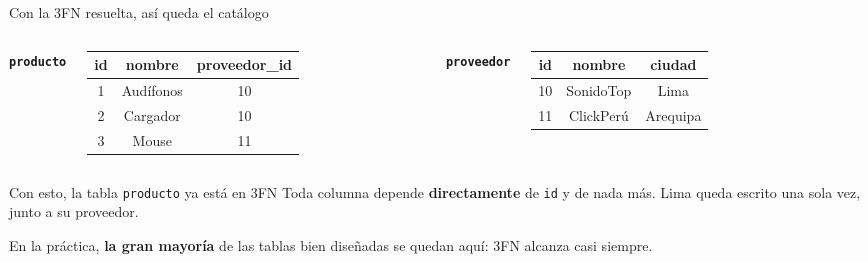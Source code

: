 \documentclass[aspectratio=169,10pt,c]{beamer}
\newcommand{\tbl}[1]{\textcolor{utpNaranja}{\texttt{#1}}}
\newcommand{\tblb}[1]{\textcolor{utpNaranja}{\textbf{\texttt{#1}}}}
\begin{document}
\begin{frame}{Con la 3FN resuelta, así queda el catálogo}
\begin{columns}[T,onlytextwidth]
\centering\footnotesize \tblb{producto}\\[3pt]
\begin{tabular}{ccc}
\toprule
\bfseries id & \bfseries nombre & \bfseries proveedor\_id \\
\midrule
1 & Audífonos & 10 \\
2 & Cargador & 10 \\
3 & Mouse & 11 \\
\bottomrule
\end{tabular}
\centering\footnotesize \tblb{proveedor}\\[3pt]
\begin{tabular}{ccc}
\toprule
\bfseries id & \bfseries nombre & \bfseries ciudad \\
\midrule
10 & SonidoTop & Lima \\
11 & ClickPerú & Arequipa \\
\bottomrule
\end{tabular}
\end{columns}
\vspace{0.4cm}
\begin{block}{Con esto, la tabla \tbl{producto} ya está en 3FN}
\small Toda columna depende \textbf{directamente} de \texttt{id} y de nada más. Lima queda escrito una sola vez, junto a su proveedor.
\end{block}
\vspace{0.2cm}
\small En la práctica, \textbf{la gran mayoría} de las tablas bien diseñadas se quedan aquí: 3FN alcanza casi siempre.
\end{frame}
\end{document}
